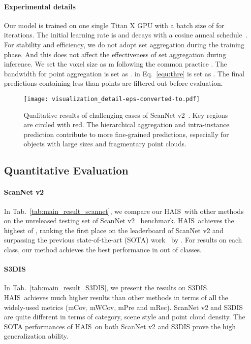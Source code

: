 \documentclass[10pt,twocolumn,letterpaper]{article}
\newcommand{\thename}{HAIS}
\begin{document}
\paragraph{Experimental details} 
Our model is trained on one single Titan X GPU with a batch size of  for  iterations. The initial learning rate is  and decays with a cosine anneal schedule~\cite{CosineLr}. For stability and efficiency, we do not adopt set aggregation during the training phase. And this does not affect the effectiveness of set aggregation during inference.
We set the voxel size as m following the common practice \cite{MASC, PointGroup}. The bandwidth  for point aggregation is set as .
 in Eq.~\ref{equ:thre} is set as .
The final predictions containing less than  points are filtered out before evaluation. 


\begin{figure*}[htb]
\centering
\texttt{[image: visualization\_detail-eps-converted-to.pdf]}
\caption{Qualitative results of challenging cases of ScanNet v2~\cite{ScanNet}. Key regions are circled with red.
The hierarchical aggregation and intra-instance prediction contribute to more fine-grained predictions, especially for objects with large sizes and fragmentary point clouds.}
\label{fig:visualization_detail}
\end{figure*}

\subsection{Quantitative Evaluation}
\label{sec:quant}
\paragraph{ScanNet v2}
In  Tab.~\ref{tab:main_result_scannet}, we compare our \thename\ with other methods on the unreleased testing set of ScanNet v2~\cite{ScanNet} benchmark. \thename\ achieves the highest  of , ranking the first place on the leaderboard of ScanNet v2 and surpassing the previous state-of-the-art (SOTA) work~\cite{GICN} by .
For results on each class, our method achieves the best performance in  out of  classes.

\paragraph{S3DIS} 
In Tab.~\ref{tab:main_result_S3DIS}, we present the results on S3DIS. \thename\ achieves much higher results than other methods in terms of all the widely-used metrics (mCov, mWCov, mPre and mRec).
ScanNet v2 and S3DIS are quite different in terms of category, scene style and point cloud density. The SOTA performances of \thename\ on both ScanNet v2 and S3DIS prove the high generalization ability.
\end{document}
